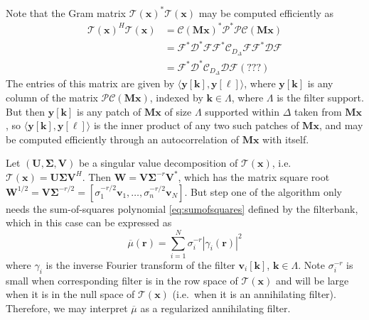 \documentclass[10pt, twocolumn, twoside]{IEEEtran}
\newcommand{\mbf}{\mathbf}
\newcommand{\bs}{\boldsymbol}
\begin{document}
Note that the Gram matrix $\mathcal{T}(\mbf x)^* \mathcal{T}(\mbf x)$ may be computed efficiently as
\begin{align}
\mathcal{T}(\mbf x)^H \mathcal{T}(\mbf x) & = \mathcal{C}(\mbf M\mbf x)^*\mathcal{P}^*\mathcal{P}\mathcal{C}(\mbf M\mbf x)\\
 & = \mathcal{F}^*\mathcal{D}^*\mathcal{F}\mathcal{F}^*\mathcal{C}_{D_\Delta}\mathcal{F}\mathcal{F}^*\mathcal{D}\mathcal{F}\\
 & = \mathcal{F}^*\mathcal{D}^*\mathcal{C}_{D_\Delta}\mathcal{D}\mathcal{F} (???)
\end{align}
The entries of this matrix are given by $\langle \mbf y[\mbf k], \mbf y[\bs \ell]\rangle$, where $\mbf y[\mbf k]$ is any column of the matrix $\mathcal{P}\mathcal{C}(\mbf M\mbf x)$, indexed by $\mbf k\in\Lambda$, where $\Lambda$ is the filter support. But then $\mbf y[\mbf k]$ is any patch of $\mbf M \mbf x$ of size $\Lambda$ supported within $\Delta$ taken from $\mbf M \mbf x$, so $\langle \mbf y[\mbf k], \mbf y[\bs \ell]\rangle$ is the inner product of any two such patches of $\mbf M\mbf x$, and may be computed efficiently through an autocorrelation of $\mbf M \mbf x$ with itself.

Let $(\mathbf U,\boldsymbol \Sigma, \mathbf V)$ be a singular value decomposition of $\mathcal{T}(\mbf x)$, i.e.\ $\mathcal{T}(\mbf x) = \mbf U \bs \Sigma \mbf V^H$.
Then $\mathbf W = \mathbf V \boldsymbol \Sigma^{-r} \mathbf V^*$, which has the matrix square root $\mathbf W^{1/2} = \mathbf V \boldsymbol \Sigma^{-r/2} = [\sigma_1^{-r/2} \mathbf v_1, \ldots, \sigma_n^{-r/2} \mathbf v_N]$. But step one of the algorithm only needs the sum-of-squares polynomial \eqref{eq:sumofsquares} defined by the filterbank, which in this case can be expressed as
\begin{equation}
\label{eq:mask1}
\overline{\mu}(\mathbf r) = \sum_{i=1}^N \sigma_i^{-r} |\gamma_i(\mathbf r)|^2
\end{equation}
where $\gamma_i$ is the inverse Fourier transform of the filter $\mathbf v_i[\mbf k]$, $\mbf k \in \Lambda$. Note $\sigma_i^{-r}$ is small when corresponding filter is in the row space of $\mathcal{T}(\mbf x)$ and will be large when it is in the null space of $\mathcal{T}(\mbf x)$ (i.e.\ when it is an annihilating filter). Therefore, we may interpret $\overline{\mu}$ as a regularized annihilating filter.
\end{document}
